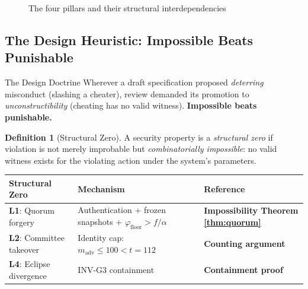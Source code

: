 \documentclass[11pt, a4paper]{article}
\theoremstyle{plain}
\theoremstyle{definition}
\newtheorem{definition}{Definition}
\theoremstyle{remark}
\begin{document}
\begin{figure}[h]
\caption{The four pillars and their structural interdependencies}
\end{figure}

\subsection{The Design Heuristic: Impossible Beats Punishable}

\begin{keybox}{The Design Doctrine}
Wherever a draft specification proposed \emph{deterring} misconduct
(slashing a cheater), review demanded its promotion to
\emph{unconstructibility} (cheating has no valid witness).
\textbf{Impossible beats punishable.}
\end{keybox}

\begin{definition}[Structural Zero]
\label{def:structural-zero}
A security property is a \emph{structural zero} if violation is not
merely improbable but \emph{combinatorially impossible}: no valid
witness exists for the violating action under the system's parameters.
\end{definition}

\begin{table}[h]
\centering
{}
\begin{tabular}{lll}
\toprule
\rowcolor{hsmaGreen!20} \textbf{Structural Zero} & \textbf{Mechanism} & \textbf{Reference} \\
\midrule
\textcolor{hsmaGreen}{\textbf{L1}}: Quorum forgery & Authentication + frozen snapshots + $\varphi_{\text{floor}} > f/\alpha$ & \textbf{Impossibility Theorem \ref{thm:quorum}} \\
\textcolor{hsmaGreen}{\textbf{L2}}: Committee takeover & Identity cap: $m_{\text{adv}} \le 100 < t = 112$ & \textbf{Counting argument} \\
\textcolor{hsmaGreen}{\textbf{L4}}: Eclipse divergence & INV-G3 containment & \textbf{Containment proof} \\
\bottomrule
\end{tabular}
\end{table}
\end{document}
